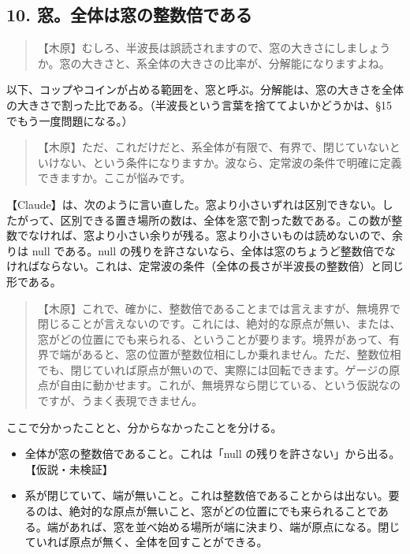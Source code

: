 \documentclass[
  a4paper,
]{ltjsarticle}
\providecommand{\tightlist}{%
  \setlength{\itemsep}{0pt}\setlength{\parskip}{0pt}}
\begin{document}
\subsection{10.
窓。全体は窓の整数倍である}\label{ux7a93ux5168ux4f53ux306fux7a93ux306eux6574ux6570ux500dux3067ux3042ux308b}

\begin{quote}
【木原】むしろ、半波長は誤読されますので、窓の大きさにしましょうか。窓の大きさと、系全体の大きさの比率が、分解能になりますよね。
\end{quote}

以下、コップやコインが占める範囲を、窓と呼ぶ。分解能は、窓の大きさを全体の大きさで割った比である。（半波長という言葉を捨ててよいかどうかは、§15
でもう一度問題になる。）

\begin{quote}
【木原】ただ、これだけだと、系全体が有限で、有界で、閉じていないといけない、という条件になりますか。波なら、定常波の条件で明確に定義できますか。ここが悩みです。
\end{quote}

【Claude】は、次のように言い直した。窓より小さいずれは区別できない。したがって、区別できる置き場所の数は、全体を窓で割った数である。この数が整数でなければ、窓より小さい余りが残る。窓より小さいものは読めないので、余りは
null である。null
の残りを許さないなら、全体は窓のちょうど整数倍でなければならない。これは、定常波の条件（全体の長さが半波長の整数倍）と同じ形である。

\begin{quote}
【木原】これで、確かに、整数倍であることまでは言えますが、無境界で閉じることが言えないのです。これには、絶対的な原点が無い、または、窓がどの位置にでも来られる、ということが要ります。境界があって、有界で端があると、窓の位置が整数位相にしか乗れません。ただ、整数位相でも、閉じていれば原点が無いので、実際には回転できます。ゲージの原点が自由に動かせます。これが、無境界なら閉じている、という仮説なのですが、うまく表現できません。
\end{quote}

ここで分かったことと、分からなかったことを分ける。

\begin{itemize}
\tightlist
\item
  全体が窓の整数倍であること。これは「null
  の残りを許さない」から出る。【仮説・未検証】
\item
  系が閉じていて、端が無いこと。これは整数倍であることからは出ない。要るのは、絶対的な原点が無いこと、窓がどの位置にでも来られることである。端があれば、窓を並べ始める場所が端に決まり、端が原点になる。閉じていれば原点が無く、全体を回すことができる。
\end{itemize}
\end{document}
